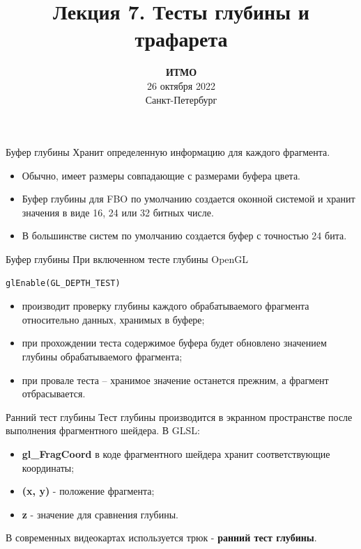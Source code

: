 \documentclass[aspectration=1610,t]{beamer}
\title{Лекция 7. Тесты глубины и трафарета}
\date{
   \textbf{ИТМО}\\
   26 октября 2022\\
   Санкт-Петербург
}
\begin{document}
\begin{frame}
  \titlepage
\end{frame}

\begin{frame}[fragile]{Буфер глубины}
    Хранит определенную информацию для каждого фрагмента.
    \begin{itemize}
        \item Обычно, имеет размеры совпадающие с размерами буфера цвета.
        \item Буфер глубины для FBO по умолчанию создается оконной системой и хранит значения в виде 16, 24 или 32 битных числе.
        \item В большинстве систем по умолчанию создается буфер с точностью 24 бита.
    \end{itemize}
\end{frame}

\begin{frame}[fragile]{Буфер глубины}
    При включенном тесте глубины OpenGL
    {\small \begin{lstlisting}
glEnable(GL_DEPTH_TEST)
    \end{lstlisting}}
    \begin{itemize}
        \item производит проверку глубины каждого обрабатываемого фрагмента относительно данных, хранимых в буфере;
        \item при прохождении теста содержимое буфера будет обновлено значением глубины обрабатываемого фрагмента;
        \item при провале теста – хранимое значение останется прежним, а фрагмент отбрасывается.
    \end{itemize}
\end{frame}

\begin{frame}[fragile]{Ранний тест глубины}
    Тест глубины производится в экранном пространстве после выполнения фрагментного шейдера. В GLSL:
    \begin{itemize}
        \item {\bf gl\_FragCoord} в коде фрагментного шейдера хранит соответствующие координаты;
        \item {\bf (x, y)} - положение фрагмента;
        \item {\bf z} - значение для сравнения глубины.
    \end{itemize}
    В современных видеокартах используется трюк - {\bf ранний тест глубины}.
\end{frame}
\end{document}
